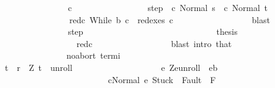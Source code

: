 \begin{isabellebody}
\ \ \ \ \ \ \ \ \ \ \ \ \ \ \isamarkupfalse%
\ c{\isacharprime}{\isacharprime}{\isacharprime}\ \isanewline
\ \ \ \ \ \ \ \ \ \ \ \ \ \ \ \ step{\isacharcolon}\ {\isachardoublequoteopen}{\isasymGamma}{\isasymturnstile}\ {\isacharparenleft}c{\isacharprime}{\isacharprime}{\isacharcomma}\ Normal\ s{\isacharparenright}\ {\isasymrightarrow}\isactrlsup {\isacharplus}\ {\isacharparenleft}c{\isacharprime}{\isacharprime}{\isacharprime}{\isacharcomma}\ Normal\ t{\isacharparenright}{\isachardoublequoteclose}\ \isanewline
\ \ \ \ \ \ \ \ \ \ \ \ \ \ \ \ red{\isacharunderscore}c{\isacharprime}{\isacharprime}{\isacharcolon}\ {\isachardoublequoteopen}While\ b\ c\ {\isasymin}\ redexes\ c{\isacharprime}{\isacharprime}{\isacharprime}{\isachardoublequoteclose}\isanewline
\ \ \ \ \ \ \ \ \ \ \ \ \ \ \ \ \isamarkupfalse%
\ blast\isanewline
\ \ \ \ \ \ \ \ \ \ \ \ \ \ \isamarkupfalse%
\ step\isanewline
\ \ \ \ \ \ \ \ \ \ \ \ \ \ \isamarkupfalse%
\isanewline
\ \ \ \ \ \ \ \ \ \ \ \ \ \ \isamarkupfalse%
\ {\isacharquery}thesis\ \isanewline
\ \ \ \ \ \ \ \ \ \ \ \ \ \ \ \ \isamarkupfalse%
\ red{\isacharunderscore}c{\isacharprime}{\isacharprime}\isanewline
\ \ \ \ \ \ \ \ \ \ \ \ \ \ \ \ \isamarkupfalse%
\ {\isacharparenleft}blast\ intro{\isacharcolon}\ that{\isacharparenright}\isanewline
\ \ \ \ \ \ \ \ \ \ \ \ \isamarkupfalse%
\isanewline
\ \ \ \ \ \ \ \ \ \ \ \ \isamarkupfalse%
\ \isamarkupfalse%
\ noabort\ termi\isanewline
\ \ \ \ \ \ \ \ \ \ \ \ \isamarkupfalse%
\ \isanewline
\ \ \ \ \ \ \ \ \ \ \ \ \isamarkupfalse%
\ {\isachardoublequoteopen}{\isacharparenleft}t{\isacharcomma}{\isasymtau}{\isacharparenright}\ {\isasymin}\ {\isacharquery}r\ {\isasymand}\ {\isacharparenleft}Z{\isacharcomma}\ t{\isacharparenright}\ {\isasymin}\ {\isacharquery}unroll\ {\isasymand}\ \isanewline
\ \ \ \ \ \ \ \ \ \ \ \ \ \ \ \ \ \ {\isacharparenleft}{\isasymforall}e{\isachardot}\ {\isacharparenleft}Z{\isacharcomma}e{\isacharparenright}{\isasymin}{\isacharquery}unroll\ {\isasymlongrightarrow}\ e{\isasymin}b\isanewline
\ \ \ \ \ \ \ \ \ \ \ \ \ \ \ \ \ \ \ \ \ \ \ \ {\isasymlongrightarrow}\ {\isasymGamma}{\isasymturnstile}{\isasymlangle}c{\isacharcomma}Normal\ e{\isasymrangle}\ {\isasymRightarrow}{\isasymnotin}{\isacharparenleft}{\isacharbraceleft}Stuck{\isacharbraceright}\ {\isasymunion}\ Fault\ {\isacharbackquote}\ {\isacharparenleft}{\isacharminus}F{\isacharparenright}{\isacharparenright}\ {\isasymand}\ \isanewline

\end{isabellebody}
